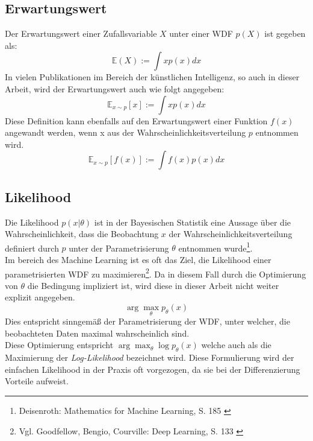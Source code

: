\subsection{Erwartungswert}

Der Erwartungswert einer Zufallsvariable $X$ unter einer \ac{WDF} $p(X)$ ist gegeben als: 
\begin{equation}
    \mathbb E(X) := \int x p(x) dx
\end{equation}
In vielen Publikationen im Bereich der künstlichen Intelligenz, so auch in dieser Arbeit, wird der Erwartungswert auch wie folgt angegeben:
\begin{equation}
    \mathbb E_{x \sim p}[x] := \int x p(x) dx
\end{equation}
Diese Definition kann ebenfalls auf den Erwartungswert einer Funktion $f(x)$ angewandt werden, wenn x aus der Wahrscheinlichkeitsverteilung $p$ entnommen wird. 
\begin{equation}
    \mathbb E_{x \sim p}[f(x)] := \int f(x) p(x) dx
\end{equation}

\subsection{Likelihood}

Die Likelihood $p(x|\theta)$ ist in der Bayesischen Statistik eine Aussage über die Wahrscheinlichkeit, dass die Beobachtung $x$ der Wahrscheinlichkeitsverteilung definiert durch $p$ unter der Parametrisierung $\theta$ entnommen wurde\footnote{
    Deisenroth: Mathematics for Machine Learning, S. 185
    \cite{Deisenroth2020}
}. \\
Im bereich des Machine Learning ist es oft das Ziel, die Likelihood einer parametrisierten \ac{WDF} zu maximieren\footnote{
    Vgl. Goodfellow, Bengio, Courville: Deep Learning, S. 133
    \cite{Goodfellow-et-al-2016}
}. Da in diesem Fall durch die Optimierung von $\theta$ die Bedingung impliziert ist, wird diese in dieser Arbeit nicht weiter explizit angegeben.
\begin{equation}
    \arg\max_\theta p_\theta(x)
\end{equation}
Dies entspricht sinngemäß der Parametrisierung der \ac{WDF}, unter welcher, die beobachteten Daten maximal wahrscheinlich sind. \\
Diese Optimierung entspricht $\arg\max_\theta \log p_\theta(x)$ welche auch als die Maximierung der \textit{Log-Likelihood} bezeichnet wird. Diese Formulierung wird der einfachen Likelihood in der Praxis oft vorgezogen, da sie bei der Differenzierung Vorteile aufweist.

